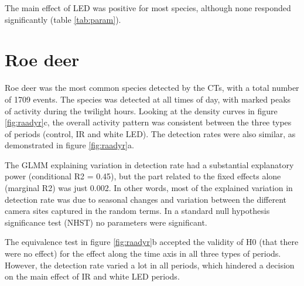 The main effect of LED was positive for most species, although none responded significantly (table \ref{tab:param}).

\begin{table}[ht]  %
\caption[Results of GLMM]
{%
Results of generalised linear mixed effects models on detection rate of species at 56 different locations in south-eastern Norway,%
}
\label{tab:param}
\small


 
%


\clearpage %

\section{Roe deer}
Roe deer was the most common species detected by the CTs, with a total number of 1709 events.
The species was detected at all times of day, with marked peaks of activity during the twilight hours.
Looking at the density curves in figure \ref{fig:raadyr}c, the overall activity pattern was consistent between the three types of periods (control, IR and white LED). 
The detection rates were also similar, as demonstrated in figure \ref{fig:raadyr}a.

The GLMM explaining variation in detection rate had a substantial explanatory power (conditional R2 = 0.45), but the part related to the fixed effects alone (marginal R2) was just 0.002.
In other words, most of the explained variation in detection rate was due to seasonal changes and variation between the different camera sites captured in the random terms.
In a standard null hypothesis significance test (NHST) no parameters were significant.

The equivalence test in figure \ref{fig:raadyr}b accepted the validity of H0 (that there were no effect) for the effect along the time axis in all three types of periods.
However, the detection rate varied a lot in all periods, which hindered a decision on the main effect of IR and white LED periods. 



\end{table}
